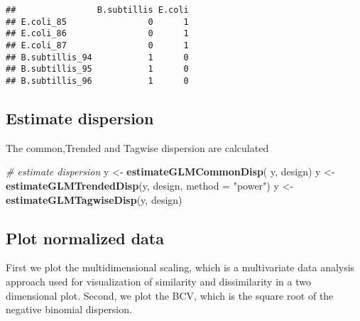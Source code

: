\documentclass[]{article}
\newenvironment{Shaded}{\begin{snugshade}}{\end{snugshade}}
\newcommand{\KeywordTok}[1]{\textcolor[rgb]{0.13,0.29,0.53}{\textbf{#1}}}
\newcommand{\DataTypeTok}[1]{\textcolor[rgb]{0.13,0.29,0.53}{#1}}
\newcommand{\DecValTok}[1]{\textcolor[rgb]{0.00,0.00,0.81}{#1}}
\newcommand{\StringTok}[1]{\textcolor[rgb]{0.31,0.60,0.02}{#1}}
\newcommand{\CommentTok}[1]{\textcolor[rgb]{0.56,0.35,0.01}{\textit{#1}}}
\newcommand{\OperatorTok}[1]{\textcolor[rgb]{0.81,0.36,0.00}{\textbf{#1}}}
\newcommand{\NormalTok}[1]{#1}
\begin{document}
\begin{Shaded}
\end{Shaded}

\begin{verbatim}
##                B.subtillis E.coli
## E.coli_85                0      1
## E.coli_86                0      1
## E.coli_87                0      1
## B.subtillis_94           1      0
## B.subtillis_95           1      0
## B.subtillis_96           1      0
\end{verbatim}

\subsection{Estimate dispersion}\label{estimate-dispersion}

The common,Trended and Tagwise dispersion are calculated

\begin{Shaded}
\begin{Highlighting}[]
\CommentTok{# estimate dispersion}
\NormalTok{y <-}\StringTok{ }\KeywordTok{estimateGLMCommonDisp}\NormalTok{( y, design)}
\NormalTok{y <-}\StringTok{ }\KeywordTok{estimateGLMTrendedDisp}\NormalTok{(y, design, }\DataTypeTok{method =} \StringTok{"power"}\NormalTok{)}
\NormalTok{y <-}\StringTok{ }\KeywordTok{estimateGLMTagwiseDisp}\NormalTok{(y, design)}
\end{Highlighting}
\end{Shaded}

\subsection{Plot normalized data}\label{plot-normalized-data}

First we plot the multidimensional scaling, which is a multivariate data
analysis approach used for visualization of similarity and dissimilarity
in a two dimensional plot. Second, we plot the BCV, which is the square
root of the negative binomial dispersion.
\end{document}
